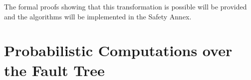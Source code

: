 
The formal proofs showing that this transformation is possible will be provided and the algorithms will be implemented in the Safety Annex.  


\section{Probabilistic Computations over the Fault Tree}














